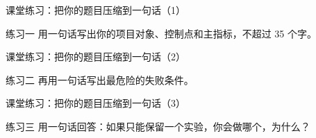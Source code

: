 \begin{frame}{课堂练习：把你的题目压缩到一句话（1）}
\begin{block}{练习一}
    用一句话写出你的项目对象、控制点和主指标，不超过 35 个字。
  \end{block}
\end{frame}

\begin{frame}{课堂练习：把你的题目压缩到一句话（2）}
\begin{block}{练习二}
    再用一句话写出最危险的失败条件。
  \end{block}
\end{frame}

\begin{frame}{课堂练习：把你的题目压缩到一句话（3）}
\begin{block}{练习三}
    用一句话回答：如果只能保留一个实验，你会做哪个，为什么？
  \end{block}
\end{frame}
